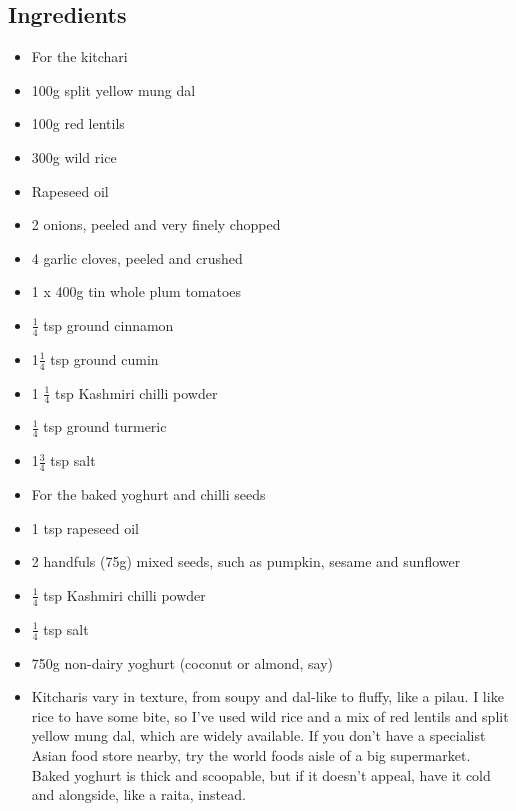 \documentclass{book}
\begin{document}
\subsection*{Ingredients}
\begin{itemize}
\item For the kitchari
\item 100g split yellow mung dal
\item 100g red lentils 
\item 300g wild rice
\item Rapeseed oil 
\item 2 onions, peeled and very finely chopped 
\item 4 garlic cloves, peeled and crushed 
\item 1 x 400g tin whole plum tomatoes 
\item $\frac{1}{4}$ tsp ground cinnamon 
\item 1$\frac{1}{4}$ tsp ground cumin 
\item 1 $\frac{1}{4}$ tsp Kashmiri chilli powder
\item $\frac{1}{4}$ tsp ground turmeric 
\item 1$\frac{3}{4}$ tsp salt 
\end{itemize}

\begin{itemize}
\item For the baked yoghurt and chilli seeds
\item 1 tsp rapeseed oil 
\item 2 handfuls (75g) mixed seeds, such as pumpkin, sesame and sunflower
\item $\frac{1}{4}$ tsp Kashmiri chilli powder
\item $\frac{1}{4}$ tsp salt 
\item 750g non-dairy yoghurt (coconut or almond, say)
\item Kitcharis vary in texture, from soupy and dal-like to fluffy, like a pilau. I like rice to have some bite, so I’ve used wild rice and a mix of red lentils and split yellow mung dal, which are widely available. If you don’t have a specialist Asian food store nearby, try the world foods aisle of a big supermarket. Baked yoghurt is thick and scoopable, but if it doesn’t appeal, have it cold and alongside, like a raita, instead.
\end{itemize}
\end{document}
